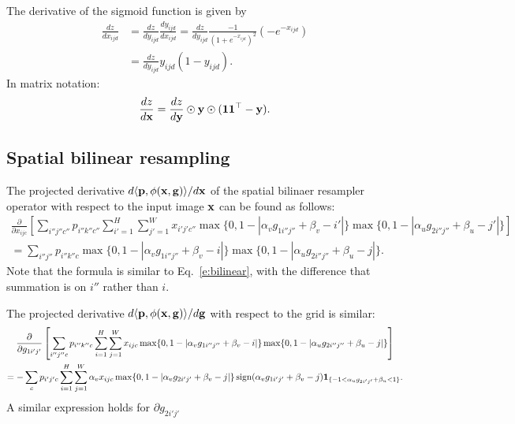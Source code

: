 The derivative of the sigmoid function is given by
\begin{align*}
\frac{dz}{dx_{ijd}}
&= 
\frac{dz}{d y_{ijd}} 
\frac{d y_{ijd}}{d x_{ijd}}
=
\frac{dz}{d y_{ijd}} 
\frac{-1}{(1+e^{-x_{ijd}})^2} ( - e^{-x_{ijd}})
\\
&=
\frac{dz}{d y_{ijd}} 
y_{ijd} (1 - y_{ijd}).
\end{align*}
In matrix notation:
\[
\frac{dz}{d\mathbf{x}} = \frac{dz}{d\mathbf{y}} \odot 
\mathbf{y} \odot 
(\mathbf{1}\mathbf{1}^\top - \mathbf{y}).
\]


\subsection{Spatial bilinear resampling}\label{s:impl-sampler}

The projected derivative $d\langle \mathbf{p}, \phi(\mathbf{x},\mathbf{g})\rangle / d\mathbf{x}$ of the spatial bilinaer resampler operator with respect to the input image $\mathbf{x}$ can be found as follows:
\begin{multline}\label{e:bilinear-back-x}
\frac{\partial}{\partial x_{ijc}}
\left[
\sum_{i''j''c''}
p_{i''k''c''}
\sum_{i'=1}^H
\sum_{j'=1}^W 
x_{i'j'c''}
\max\{0, 1-|\alpha_v g_{1i''j''} + \beta_v -i'|\}
\max\{0, 1-|\alpha_u g_{2i''j''} + \beta_u -j'|\}
\right]
\\
=
\sum_{i''j''}
p_{i''k''c}
\max\{0, 1-|\alpha_v g_{1i''j''} + \beta_v -i|\}
\max\{0, 1-|\alpha_u g_{2i''j''} + \beta_u -j|\}.
\end{multline}
Note that the formula is similar to Eq.~\ref{e:bilinear}, with the difference that summation is on $i''$ rather than $i$.

The projected derivative $d\langle \mathbf{p}, \phi(\mathbf{x},\mathbf{g})\rangle / d\mathbf{g}$ with respect to the grid is similar:
\begin{multline}\label{e:bilinear-back-g}
\frac{\partial}{\partial g_{1i'j'}}
\left[
\sum_{i''j''c}
p_{i''k''c}
\sum_{i=1}^H
\sum_{j=1}^W 
x_{ijc}
\max\{0, 1-|\alpha_v g_{1i''j''} + \beta_v -i|\}
\max\{0, 1-|\alpha_u g_{2i''j''} + \beta_u -j|\}
\right]
\\
=
-
\sum_c
p_{i'j'c}
\sum_{i=1}^H
\sum_{j=1}^W
\alpha_v x_{ijc}
\max\{0, 1-|\alpha_v g_{2i'j'} + \beta_v -j|\}
\sign(\alpha_v g_{1i'j'} + \beta_v -j)
\mathbf{1}_{\{-1 < \alpha_u g_{2i'j'} + \beta_u < 1\}}.
\end{multline}
A similar expression holds for $\partial g_{2i'j'}$

